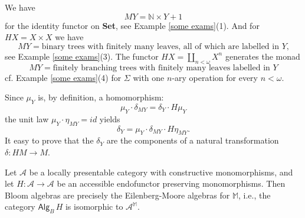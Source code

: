\documentclass{LMCS}
\theoremstyle{plain}
\theoremstyle{definition}
\numberwithin{equation}{section}
\begin{document}
\begin{exa}\label{4.14}
We have $$MY={\mathbb N}\times Y+1$$
for the identity functor on {\bf Set}, see Example \ref{some exams}(1). And for $HX=X\times X$ we have 
$$MY=\text{binary trees with finitely many leaves, all of which are labelled in $Y$,}$$
 see Example \ref{some exams}(3). The functor $HX=\coprod_{n<\omega} X^n$ generates the monad
$$MY=\text{finitely branching trees with finitely many leaves labelled in $Y$}$$ cf. Example \ref{some exams}(4) for $\Sigma$ with one $n$-ary operation for every $n<\omega$.
\end{exa}

\begin{rem}\label{4.15}
Since $\mu_Y$ is, by definition, a homomorphism:
$$\mu_Y\cdot\delta_{MY}=\delta_Y\cdot H\mu_Y$$
the unit law $\mu_Y\cdot\eta_{MY}=id$ yields
$$\delta_Y=\mu_Y\cdot\delta_{MY}\cdot H\eta_{MY}.$$
It easy to prove that the $\delta_Y$ are the components of a natural transformation $\delta:HM\rightarrow M$. 
\end{rem}

\begin{thm}\label{the bloom alg=eilenberg moor off M_H}
Let $\mathcal A$ be a locally presentable category with constructive
monomorphisms, and let $H: \mathcal A \to \mathcal A$ be an accessible
endofunctor preserving monomorphisms. Then Bloom algebras are
precisely the Eilenberg-Moore algebras for $\mathbb M$, i.e., the
category $\mathsf{Alg}_B\,H$ is isomorphic to ${\mathcal A}^{\mathbb  M}$. 
\end{thm}
\end{document}
